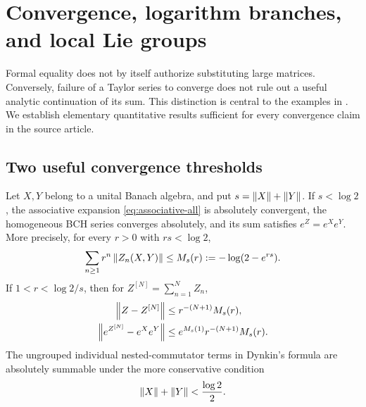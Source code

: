 \section{Convergence, logarithm branches, and local Lie groups}\label{sec:convergence}
Formal equality does not by itself authorize substituting large matrices. Conversely, failure of a Taylor series to converge does not rule out a useful analytic continuation of its sum. This distinction is central to the examples in \cite{BiagiBonfiglioliMatone}. We establish elementary quantitative results sufficient for every convergence claim in the source article.

\subsection{Two useful convergence thresholds}
\begin{theorem}\label{thm:convergence}
Let $X,Y$ belong to a unital Banach algebra, and put $s=\left\lVert X\right\rVert+\left\lVert Y\right\rVert$.
If $s<\log2$, the associative expansion \cref{eq:associative-all} is absolutely convergent, the homogeneous BCH series converges absolutely, and its sum satisfies $e^Z=e^Xe^Y$. More precisely, for every $r>0$ with $rs<\log2$,
\begin{equation}\label{eq:majorant}
 \sum_{n\geq1}r^n\left\lVert Z_n(X,Y)\right\rVert
 \leq M_s(r):=-\log(2-e^{rs}).
\end{equation}
If $1<r<\log2/s$, then for $Z^{[N]}=\sum_{n=1}^NZ_n$,
\begin{align}
 \left\lVert Z-Z^{[N]}\right\rVert&\leq r^{-(N+1)}M_s(r),\label{eq:remainder}\\
 \left\lVert e^{Z^{[N]}}-e^Xe^Y\right\rVert
 &\leq e^{M_s(1)}r^{-(N+1)}M_s(r).\label{eq:exp-remainder}
\end{align}
The ungrouped individual nested-commutator terms in Dynkin's formula are absolutely summable under the more conservative condition
\begin{equation}\label{eq:dynkin-radius}
 \left\lVert X\right\rVert+\left\lVert Y\right\rVert<\frac{\log2}{2}.
\end{equation}
\end{theorem}

